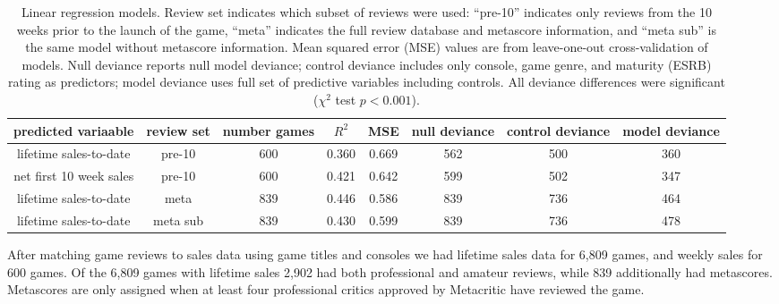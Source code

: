 \documentclass[letterpaper]{article}
\begin{document}
\begin{table}[tb]
\centering
\scriptsize
\begin{tabular}{|c|c|c|c|c|c|c|c|}
\hline\textbf{ predicted variaable} & \textbf{review set} & \textbf{number games} & $R^2$ & MSE & null deviance & control deviance & model deviance \\ 
\hline lifetime sales-to-date & pre-10 & 600 & 0.360 & 0.669 & 562 & 500 & 360\\ 
\hline net first 10 week sales & pre-10 & 600 & 0.421 & 0.642 & 599 & 502 & 347\\ 
\hline lifetime sales-to-date & meta & 839 & 0.446 & 0.586 & 839 & 736 & 464\\ 
\hline lifetime sales-to-date & meta sub & 839 & 0.430 & 0.599 & 839 & 736 & 478\\ 
\hline 
\end{tabular}
\caption{Linear regression models. Review set indicates which subset of reviews were used:
``pre-10'' indicates only reviews from the 10 weeks prior to the launch of the game,
``meta'' indicates the full review database and metascore information, and ``meta sub'' is the same model without metascore information. 
Mean squared error (MSE) values are from leave-one-out cross-validation of models. Null deviance reports null model deviance; control deviance includes only console, game genre, and maturity (ESRB) rating as predictors; model deviance uses full set of predictive variables including controls. All deviance differences were significant ($\chi^2$ test $p < 0.001$).}
\label{tab:regression_models}
\end{table}

After matching game reviews to sales data using game titles and consoles we had lifetime sales data for 6,809 games, and weekly sales for 600 games. Of the 6,809 games with lifetime sales 2,902 had both professional and amateur reviews, while 839 additionally had metascores. Metascores are only assigned when at least four professional critics approved by Metacritic have reviewed the game.
\end{document}
